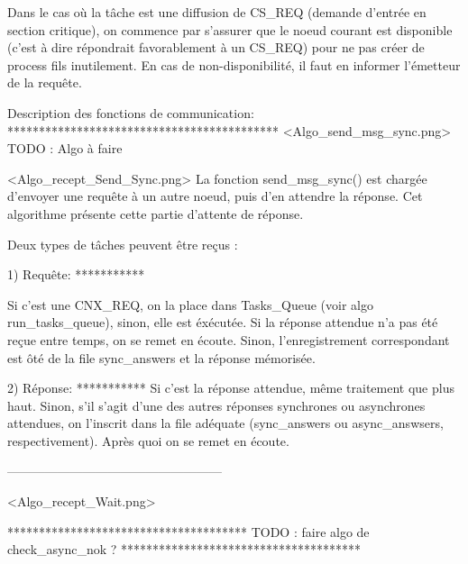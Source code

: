 Dans le cas où la tâche est une diffusion de CS_REQ (demande d'entrée en section critique), on
commence par s'assurer que le noeud courant est disponible (c'est à dire répondrait favorablement à
un CS_REQ) pour ne pas créer de process fils inutilement. En cas de non-disponibilité, il faut en
informer l'émetteur de la requête.

Description des fonctions de communication:
*******************************************
<Algo_send_msg_sync.png>  TODO : Algo à faire 

<Algo_recept_Send_Sync.png>
La fonction send_msg_sync() est chargée d'envoyer une requête à un autre noeud, puis d'en attendre
la réponse.
Cet algorithme présente cette partie d'attente de réponse.

Deux types de tâches peuvent être reçus :

1) Requête:
***********

Si c'est une CNX_REQ, on la place dans Tasks_Queue (voir algo run_tasks_queue), sinon, elle est
éxécutée. Si la réponse attendue n'a pas été reçue entre temps, on se remet en écoute. Sinon,
l'enregistrement correspondant est ôté de la file sync_answers et la réponse mémorisée.

2) Réponse:
***********
Si c'est la réponse attendue, même traitement que plus haut.
Sinon, s'il s'agit d'une des autres réponses synchrones ou asynchrones attendues, on l'inscrit dans
la file adéquate (sync_answers ou async_answsers, respectivement). Après quoi on se remet en écoute.

---------------------------------------------------

<Algo_recept_Wait.png>

**************************************
TODO : faire algo de check_async_nok ?
**************************************
